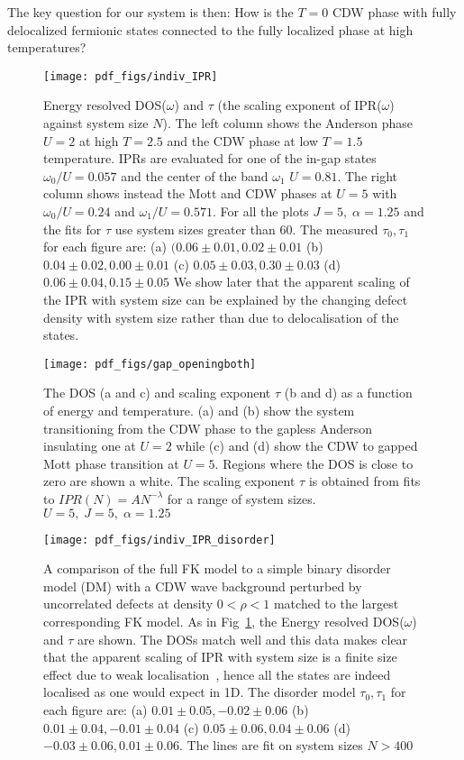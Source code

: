 The key question for our system is then: How is the \(T=0\) CDW phase with fully delocalized fermionic states connected to the fully localized phase at high temperatures? 
%
%
\begin{figure}
  \centering
    \texttt{[image: pdf\_figs/indiv\_IPR]}
  \caption{\label{fig:indiv_IPR} Energy resolved DOS(\(\omega\)) and \(\tau\) (the scaling exponent of IPR(\(\omega\)) against system size \(N\)). The left column shows the Anderson phase \(U = 2\) at high \(T = 2.5\) and the CDW phase at low \(T = 1.5\) temperature. IPRs are evaluated for one of the in-gap states \(\omega_0/U = 0.057\) and the center of the band \(\omega_1\) \(U = 0.81\). The right column shows instead the Mott and CDW phases at \(U = 5\) with \(\omega_0/U = 0.24\) and \(\omega_1/U = 0.571\).
  For all the plots \(J = 5,\;\alpha = 1.25\) and the fits for \(\tau\) use system sizes greater than 60. The measured \(\tau_0,\tau_1\) for each figure are: (a) \((0.06\pm0.01, 0.02\pm0.01\) (b) \(0.04\pm0.02, 0.00\pm0.01\) (c) \(0.05\pm0.03, 0.30\pm0.03\)
  (d) \(0.06\pm0.04,  0.15\pm0.05\)
  We show later that the apparent scaling of the IPR
  with system size can be explained by the changing defect density with system size rather than due to delocalisation of the states.}
\end{figure}

\begin{figure}
  \centering
    \texttt{[image: pdf\_figs/gap\_openingboth]}
  \caption{  \label{fig:band_opening} The \acl{DOS} (a and c) and scaling exponent \(\tau\) (b and d) as a function of energy and temperature. (a) and (b) show the system transitioning from the CDW phase to the gapless Anderson insulating one at \(U=2\) while (c) and (d) show the CDW to gapped Mott phase transition at \(U=5\). Regions where the DOS is close to zero are shown a white. The scaling exponent \(\tau\) is obtained from fits to \(IPR(N) = A N^{-\lambda}\) for a range of system sizes.  \(U = 5,\;J = 5,\;\alpha = 1.25\)}
\end{figure}

\begin{figure}[ht]
  \centering
    \texttt{[image: pdf\_figs/indiv\_IPR\_disorder]}
  \caption{  \label{fig:indiv_IPR_disorder} A comparison of the full \ac{FK} model to a simple binary disorder model (DM) with a CDW wave background perturbed by uncorrelated defects at density \(0 < \rho < 1\) matched to the largest corresponding FK model. As in Fig~\ref{fig:indiv_IPR}, the Energy resolved DOS(\(\omega\)) and \(\tau\) are shown. The DOSs match well and this data makes clear that the apparent scaling of IPR with system size is a finite size effect due to weak localisation~\cite{antipovInteractionTunedAndersonMott2016}, hence all the states are indeed localised as one would expect in 1D. The disorder model \(\tau_0,\tau_1\) for each figure are: (a) \(0.01\pm0.05, -0.02\pm0.06\) (b) \(0.01\pm0.04, -0.01\pm0.04\) (c) \(0.05\pm0.06, 0.04\pm0.06\) (d) \(-0.03\pm0.06, 0.01\pm0.06\). The lines are fit on system sizes \(N > 400\)
  }
\end{figure}

